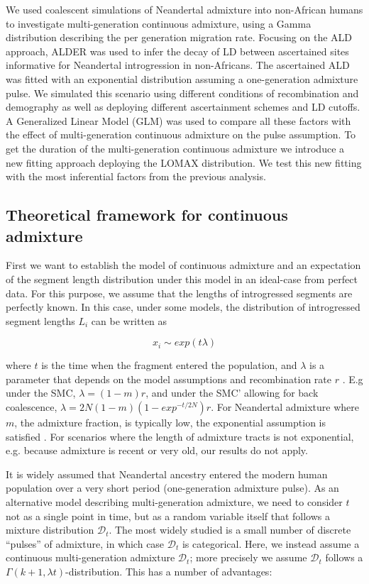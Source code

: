 \documentclass[]{article}
\begin{document}
We used coalescent simulations of Neandertal admixture into non-African humans to investigate multi-generation continuous admixture, using a Gamma distribution describing the per generation migration rate. Focusing on the ALD approach, ALDER was used to infer the decay of LD between ascertained sites informative for Neandertal introgression in non-Africans. The ascertained ALD was fitted with an exponential distribution assuming a one-generation admixture pulse.  We simulated this scenario using different conditions of recombination and demography as well as deploying different ascertainment schemes and LD cutoffs. A Generalized Linear Model (GLM) was used to compare all these factors with the effect of multi-generation continuous admixture on the pulse assumption. To get the duration of the multi-generation continuous admixture we introduce a new fitting approach deploying the LOMAX distribution. We test this new fitting with the most inferential factors from the previous analysis.

\subsection{Theoretical framework for continuous admixture}\label{theoretical framework for continuous admixture}

First we want to establish the model of continuous admixture and an
expectation of the segment length distribution under this model in an
ideal-case from perfect data. For this purpose, we assume that the
lengths of introgressed segments are perfectly known. In this case, under
some models, the distribution of introgressed segment lengths \(L_i\) can
be written as

\begin{equation}
x_i \sim exp({t \lambda})
\end{equation}

where \(t\) is the time when the fragment entered the population, and
\(\lambda\) is a parameter that depends on the model assumptions and
recombination rate \(r\) \citep{liang_lengths_2014}. E.g under the SMC,
\(\lambda = (1-m)r\), and under the SMC' allowing for back coalescence,
\(\lambda = 2N(1-m)(1-exp^{-t/2N})r\). For Neandertal admixture where
\(m\), the admixture fraction, is typically low, the exponential
assumption is satisfied \cite{liang_lengths_2014}. For scenarios where
the length of admixture tracts is not exponential, e.g. because
admixture is recent or very old, our results do not apply.

It is widely assumed that Neandertal ancestry entered the modern human
population over a very short period (one-generation admixture pulse). As an alternative model describing multi-generation admixture, we need to
consider \(t\) not as a single point in time, but as a random variable
itself that follows a mixture distribution \(\mathcal{D}_t\). The most
widely studied is a small number of discrete ``pulses'' of admixture, in
which case \(\mathcal{D}_t\) is categorical. Here, we instead assume a
continuous multi-generation admixture \(\mathcal{D}_t\); more precisely we assume \(\mathcal{D}_t\)
follows a \(\Gamma(k+1, \lambda t)\)-distribution. This has a number of
advantages:
\end{document}
